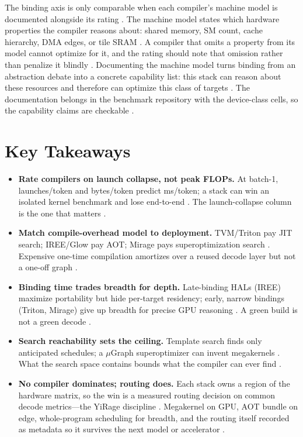 The binding axis is only comparable when each compiler's machine model is documented alongside its rating \citep{wu2024mirage,tritonlang2024,iree2024}. The machine model states which hardware properties the compiler reasons about: shared memory, SM count, cache hierarchy, DMA edges, or tile SRAM \citep{semianalysis2024tma,amd2024aie}. A compiler that omits a property from its model cannot optimize for it, and the rating should note that omission rather than penalize it blindly \citep{wu2024mirage,memoryfloor2026}. Documenting the machine model turns binding from an abstraction debate into a concrete capability list: this stack can reason about these resources and therefore can optimize this class of targets \citep{tritonlang2024,amd2024xdna}. The documentation belongs in the benchmark repository with the device-class cells, so the capability claims are checkable \citep{patel2025llminference,memoryfloor2026}.

\section{Key Takeaways}
\label{sec:ch21_key_takeaways}

\begin{itemize}
\item \textbf{Rate compilers on launch collapse, not peak FLOPs.}
At batch-1, launches/token and bytes/token predict ms/token; a stack can win an isolated kernel benchmark and lose end-to-end \citep{taxbreak2026,memoryfloor2026}. The launch-collapse column is the one that matters \citep{nvidia2024cudagraphs}.

\item \textbf{Match compile-overhead model to deployment.}
TVM/Triton pay JIT search; IREE/Glow pay AOT; Mirage pays superoptimization search \citep{zheng2020ansor,iree2024,wu2024mirage}. Expensive one-time compilation amortizes over a reused decode layer but not a one-off graph \citep{kwon2023vllm}.

\item \textbf{Binding time trades breadth for depth.}
Late-binding HALs (IREE) maximize portability but hide per-target residency; early, narrow bindings (Triton, Mirage) give up breadth for precise GPU reasoning \citep{iree2024,tritonlang2024}. A green build is not a green decode \citep{taxbreak2026}.

\item \textbf{Search reachability sets the ceiling.}
Template search finds only anticipated schedules; a $\mu$Graph superoptimizer can invent megakernels \citep{chen2018autotvm,wu2024mirage}. What the search space contains bounds what the compiler can ever find \citep{zheng2020ansor}.

\item \textbf{No compiler dominates; routing does.}
Each stack owns a region of the hardware matrix, so the win is a measured routing decision on common decode metrics---the YiRage discipline \citep{yirage2026,patel2025llminference}. Megakernel on GPU, AOT bundle on edge, whole-program scheduling for breadth, and the routing itself recorded as metadata so it survives the next model or accelerator \citep{mpk2025,rotem2018glow}.
\end{itemize}

